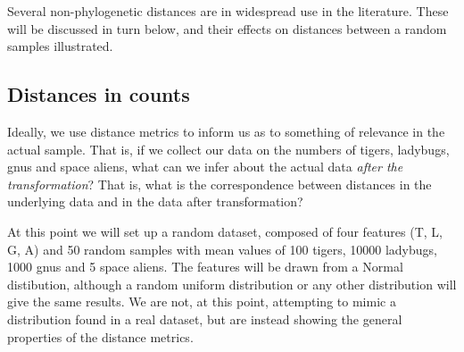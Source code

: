 \documentclass[twocolumn]{article}
\begin{document}
Several non-phylogenetic distances are in widespread use in the
literature. These will be discussed in turn below, and their effects on
distances between a random samples illustrated.

\subsection{Distances in counts}

Ideally, we use distance metrics to inform us as to something of
relevance in the actual sample. That is, if we collect our data on the
numbers of tigers, ladybugs, gnus and space aliens, what can we infer
about the actual data \emph{after the transformation}? That is, what is
the correspondence between distances in the underlying data and in the
data after transformation?

At this point we will set up a random dataset, composed of four features
(T, L, G, A) and 50 random samples with mean values of 100 tigers, 10000
ladybugs, 1000 gnus and 5 space aliens. The features will be drawn from
a Normal distibution, although a random uniform distribution or any
other distribution will give the same results. We are not, at this
point, attempting to mimic a distribution found in a real dataset, but
are instead showing the general properties of the distance metrics.
\end{document}
